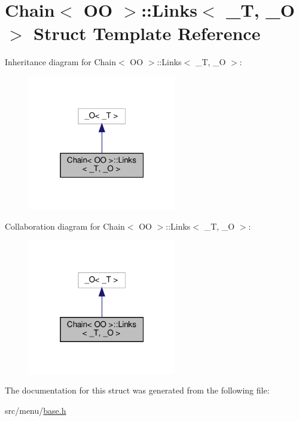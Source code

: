 \hypertarget{structChain_1_1Links_3_01__T_00_01__O_01_4}{}\section{Chain$<$ OO $>$\+:\+:Links$<$ \+\_\+T, \+\_\+O $>$ Struct Template Reference}
\label{structChain_1_1Links_3_01__T_00_01__O_01_4}


Inheritance diagram for Chain$<$ OO $>$\+:\+:Links$<$ \+\_\+T, \+\_\+O $>$\+:\nopagebreak
\begin{figure}[H]
\begin{center}
\leavevmode
\includegraphics[width=184pt]{structChain_1_1Links_3_01__T_00_01__O_01_4__inherit__graph}
\end{center}
\end{figure}


Collaboration diagram for Chain$<$ OO $>$\+:\+:Links$<$ \+\_\+T, \+\_\+O $>$\+:\nopagebreak
\begin{figure}[H]
\begin{center}
\leavevmode
\includegraphics[width=184pt]{structChain_1_1Links_3_01__T_00_01__O_01_4__coll__graph}
\end{center}
\end{figure}


The documentation for this struct was generated from the following file\+:\begin{DoxyCompactItemize}
\item 
src/menu/\hyperlink{base_8h}{base.\+h}\end{DoxyCompactItemize}
